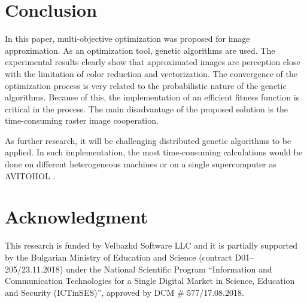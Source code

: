 \documentclass[conference]{IEEEtran}
\begin{document}
\section{Conclusion}

In this paper, multi-objective optimization was proposed for image approximation. As an optimization tool, genetic algorithms are used. The experimental results clearly show that approximated images are perception close with the limitation of color reduction and vectorization. The convergence of the optimization process is very related to the probabilistic nature of the genetic algorithms. Because of this, the implementation of an efficient fitness function is critical in the process. The main disadvantage of the proposed solution is the time-consuming raster image cooperation. 

As further research, it will be challenging distributed genetic algorithms to be applied. In such implementation, the most time-consuming calculations would be done on different heterogeneous machines or on a single supercomputer as AVITOHOL \cite{Tashev-Tasheva-Petrov-2019}. 

\section*{Acknowledgment}

This research is funded by Velbazhd Software LLC and it is partially supported by the Bulgarian Ministry of Education and Science (contract D01–205/23.11.2018) under the National Scientific Program ``Information and Communication Technologies for a Single Digital Market in Science, Education and Security (ICTinSES)'', approved by DCM \# 577/17.08.2018.
\end{document}
